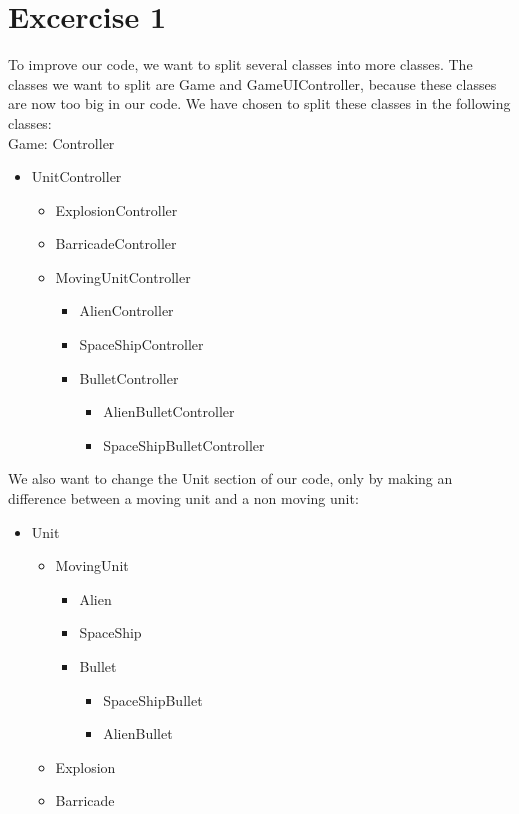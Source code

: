 \documentclass[10pt]{article}
\begin{document}
\section*{Excercise 1}
To improve our code, we want to split several classes into more classes. The classes we want to split are Game and GameUIController, because these classes are now too big in our code. We have chosen to split these classes in the following classes:\\
Game:\newline
Controller
\begin{itemize}
\item UnitController
	\begin{itemize}
	\item ExplosionController
	\item BarricadeController	
	\item MovingUnitController
		\begin{itemize}
		\item AlienController
		\item SpaceShipController
		\item BulletController
			\begin{itemize}
			\item AlienBulletController
			\item SpaceShipBulletController
			\end{itemize}
		\end{itemize}
	\end{itemize}
\end{itemize}
We also want to change the Unit section of our code, only by making an difference between a moving unit and a non moving unit:
\begin{itemize}
\item Unit
	\begin{itemize}
	\item MovingUnit
		\begin{itemize}
		\item Alien
		\item SpaceShip
		\item Bullet
			\begin{itemize}
			\item SpaceShipBullet
			\item AlienBullet
			\end{itemize}
		\end{itemize}
	\item Explosion
	\item Barricade
	\end{itemize}
\end{itemize}
\end{document}
